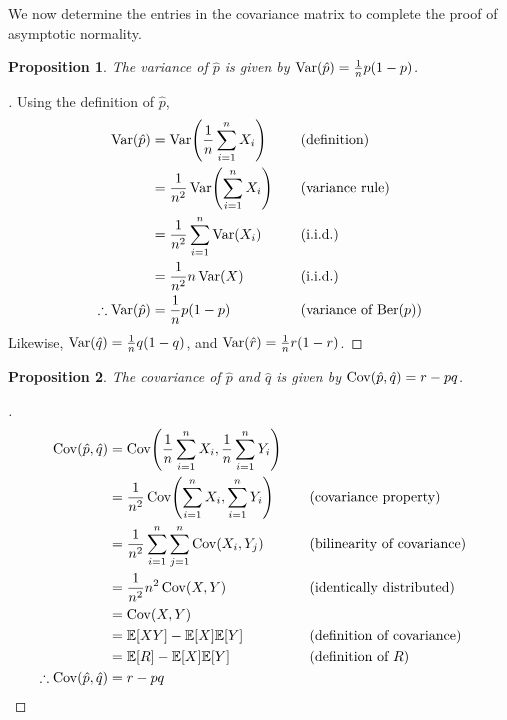 \documentclass[letterpaper, oneside, reqno]{amsart}
\newtheorem{prop}{Proposition}[section]
\renewcommand{\qedsymbol}{\ensuremath{\blacksquare}}
\newenvironment{subproof}[1][\proofname]{%
  \renewcommand{\qedsymbol}{\ensuremath{\square}}%
  \begin{proof}[#1]%
}{%
  \end{proof}%
}
\numberwithin{equation}{section}
\newcommand{\E}[1]{\mathbb{E}\mleft[#1\mright]}
\newcommand{\Var}[1]{\operatorname{Var}\mleft(#1\mright)}
\newcommand{\Cov}[1]{\operatorname{Cov}\mleft(#1\mright)}
\newcommand{\iid}{i.i.d.}
\newcommand{\sumi}[2]{\sum_{#1=1}^{#2}}
\newcommand{\avg}[2]{\frac{1}{#2}\sumi{#1}{#2}}
\newcommand{\by}[1]{&\quad&\text{(#1)}}
\newcommand{\phat}{\hat{p}}
\newcommand{\qhat}{\hat{q}}
\newcommand{\rhat}{\hat{r}}
\DeclareMathOperator{\Ber}{Ber}
\begin{document}
We now determine the entries in the covariance matrix to complete the proof of
asymptotic normality.
\begin{prop}
The variance of $\phat$ is given by $\Var{\phat} = \frac{1}{n} p(1 - p)$.
\end{prop}
\begin{subproof}
  Using the definition of $\phat$,
  \begin{alignat*}{3}
    \Var{\phat} &= \Var{\avg{i}{n} X_i} \by{definition} \\
                &= \frac{1}{n^2}\Var{\sumi{i}{n} X_i} \by{variance rule} \\
                &= \frac{1}{n^2}\sumi{i}{n}\Var{X_i} \by{\iid} \\
                &= \frac{1}{n^2}n\Var{X} \by{\iid} \\
   \therefore \Var{\phat} &= \frac{1}{n} p(1-p) \by{variance of $\Ber(p)$}
  \end{alignat*}
  Likewise, $\Var{\qhat} = \frac{1}{n} q(1 - q)$,
  and $\Var{\rhat} = \frac{1}{n} r(1 - r)$. 
\end{subproof}

\begin{prop}
  The covariance of $\phat$ and $\qhat$ is given by $\Cov{\phat, \qhat} = r - pq$.
\end{prop}
\begin{subproof}
  \begin{alignat*}{3}
    \Cov{\phat, \qhat} &= \Cov{\avg{i}{n} X_i, \avg{i}{n} Y_i} \\
    &= \frac{1}{n^2} \Cov{\sumi{i}{n} X_i, \sumi{i}{n} Y_i} \by{covariance property} \\
    &= \frac{1}{n^2} \sumi{i}{n} \sumi{j}{n} \Cov{X_i, Y_j} \by{bilinearity of covariance} \\
    &= \frac{1}{n^2} n^2 \Cov{X, Y} \by{identically distributed} \\
    &= \Cov{X, Y}  \\
    &= \E{XY} - \E{X}\E{Y} \by{definition of covariance} \\
    &= \E{R} - \E{X}\E{Y} \by{definition of $R$} \\
    \therefore \Cov{\phat, \qhat} &= r - pq \qedhere
  \end{alignat*}
\end{subproof}
\end{document}
